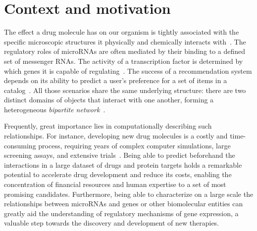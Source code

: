 

\section{Context and motivation}



The effect a drug molecule has on our organism is tightly associated with the specific microscopic structures it physically and chemically interacts with~\cite{bagherian2020machine,chen2018machine}. The regulatory roles of microRNAs are often mediated by their binding to a defined set of messenger RNAs. The activity of a transcription factor is determined by which genes it is capable of regulating~\cite{faith2007largescale}. The success of a recommendation system depends on its ability to predict a user's preference for a set of items in a catalog~\cite{lu2012recommender}.
%
All those scenarios share the same underlying structure: there are two distinct domains of objects that interact with one another, forming a heterogeneous \emph{bipartite network}~\cite{asratian1998bipartite}.
%


Frequently, great importance lies in computationally describing such relationships. For instance, developing new drug molecules is a costly and time-consuming process,
requiring years of complex computer simulations, large screening assays, and extensive trials~\cite{chen2018machine,bagherian2020machine}.  %
Being able to predict beforehand the interactions in a large dataset of drugs and protein targets holds a remarkable potential to accelerate drug development and reduce its costs, enabling the concentration of financial resources and human expertise to a set of most promising candidates. Furthermore, being able to characterize on a large scale the relationships between microRNAs and genes or other biomolecular entities can greatly aid the understanding of regulatory mechanisms of gene expression, a valuable step towards the discovery and development of new therapies. 

